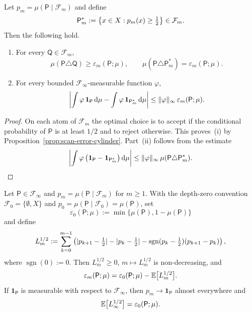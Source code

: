 \begin{proposition}
\label{prop:bayes-optimality}
Let \(p_m=\mu(\mathsf{P}\mid\mathcal{F}_m)\) and define
\[
  \mathsf{P}_m^\ast := \left\{x\in X:p_m(x)\geq \tfrac12\right\}\in\mathcal{F}_m.
\]
Then the following hold.
\begin{enumerate}[label=(\roman*)]
  \item For every \(\mathsf{Q}\in\mathcal{F}_m\),
    \[
      \mu(\mathsf{P}\triangle \mathsf{Q})
      \geq \varepsilon_m(\mathsf{P};\mu),
      \qquad
      \mu(\mathsf{P}\triangle \mathsf{P}_m^\ast)
      = \varepsilon_m(\mathsf{P};\mu).
    \]
  \item For every bounded \(\mathcal{F}_\infty\)-measurable function
    \(\varphi\),
    \[
      \left|
        \int \varphi\,\mathbf{1}_{\mathsf{P}}\,\mathrm{d}\mu
        - \int \varphi\,\mathbf{1}_{\mathsf{P}_m^\ast}\,\mathrm{d}\mu
      \right|
      \leq \lVert \varphi\rVert_\infty\,
           \varepsilon_m(\mathsf{P};\mu).
    \]
\end{enumerate}
\end{proposition}

\begin{proof}
On each atom of \(\mathcal{F}_m\) the optimal choice is to accept if the
conditional probability of \(\mathsf{P}\) is at least \(1/2\) and to
reject otherwise.  This proves~(i) by
Proposition~\ref{prop:scan-error-cylinder}.  Part~(ii) follows from the
estimate
\[
  \left|
    \int \varphi\,
      \bigl(\mathbf{1}_{\mathsf{P}}
            -\mathbf{1}_{\mathsf{P}_m^\ast}\bigr)\,\mathrm{d}\mu
  \right|
  \leq \lVert \varphi\rVert_\infty\,
       \mu(\mathsf{P}\triangle \mathsf{P}_m^\ast).
\]
\end{proof}

\begin{theorem}
\label{thm:tanaka-stokes}
Let \(\mathsf{P}\in\mathcal{F}_\infty\) and
\(p_m=\mu(\mathsf{P}\mid \mathcal{F}_m)\) for \(m\geq 1\).  With the
depth-zero convention
\(\mathcal{F}_0=\{\emptyset,X\}\) and
\(p_0=\mu(\mathsf{P}\mid\mathcal{F}_0)=\mu(\mathsf{P})\), set
\[
  \varepsilon_0(\mathsf{P};\mu)
  := \min\{\mu(\mathsf{P}),1-\mu(\mathsf{P})\}
\]
and define
\[
  L_m^{1/2}
  := \sum_{k=0}^{m-1}
      \left(
        \lvert p_{k+1}-\tfrac12\rvert
        - \lvert p_k-\tfrac12\rvert
        - \operatorname{sgn}(p_k-\tfrac12)(p_{k+1}-p_k)
      \right),
\]
where \(\operatorname{sgn}(0):=0\).  Then \(L_m^{1/2}\geq 0\),
\(m\mapsto L_m^{1/2}\) is non-decreasing, and
\[
  \varepsilon_m(\mathsf{P};\mu)
  = \varepsilon_0(\mathsf{P};\mu)
    - \mathbb{E}\bigl[L_m^{1/2}\bigr].
\]
If \(\mathbf{1}_{\mathsf{P}}\) is measurable with respect to
\(\mathcal{F}_\infty\), then \(p_m\to \mathbf{1}_{\mathsf{P}}\) almost
everywhere and
\[
  \mathbb{E}\bigl[L_\infty^{1/2}\bigr]
  = \varepsilon_0(\mathsf{P};\mu).
\]
\end{theorem}

